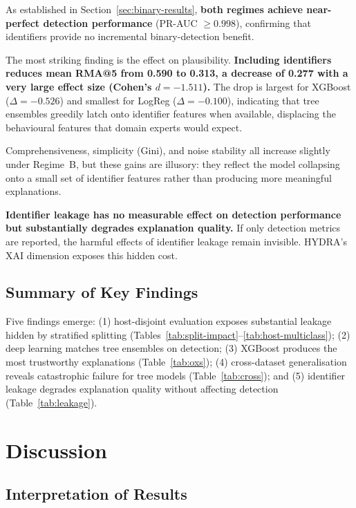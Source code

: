 \documentclass[12pt,a4paper]{report}
\begin{document}
As established in Section~\ref{sec:binary-results}, \textbf{both regimes achieve near-perfect detection performance} (PR-AUC $\geq 0.998$), confirming that identifiers provide no incremental binary-detection benefit.

The most striking finding is the effect on plausibility. \textbf{Including identifiers reduces mean RMA@5 from 0.590 to 0.313, a decrease of 0.277 with a very large effect size (Cohen's $d = -1.511$).} The drop is largest for XGBoost ($\Delta = -0.526$) and smallest for LogReg ($\Delta = -0.100$), indicating that tree ensembles greedily latch onto identifier features when available, displacing the behavioural features that domain experts would expect.

Comprehensiveness, simplicity (Gini), and noise stability all increase slightly under Regime~B, but these gains are illusory: they reflect the model collapsing onto a small set of identifier features rather than producing more meaningful explanations.

\textbf{Identifier leakage has no measurable effect on detection performance but substantially degrades explanation quality.} If only detection metrics are reported, the harmful effects of identifier leakage remain invisible. HYDRA's XAI dimension exposes this hidden cost.

\section{Summary of Key Findings}
\label{sec:results-summary}

Five findings emerge: (1) host-disjoint evaluation exposes substantial leakage hidden by stratified splitting (Tables~\ref{tab:split-impact}--\ref{tab:host-multiclass}); (2) deep learning matches tree ensembles on detection; (3) XGBoost produces the most trustworthy explanations (Table~\ref{tab:oxs}); (4) cross-dataset generalisation reveals catastrophic failure for tree models (Table~\ref{tab:cross}); and (5) identifier leakage degrades explanation quality without affecting detection (Table~\ref{tab:leakage}).

\chapter{Discussion}
\label{ch:discussion}

\section{Interpretation of Results}
\label{sec:interpretation}
\end{document}
